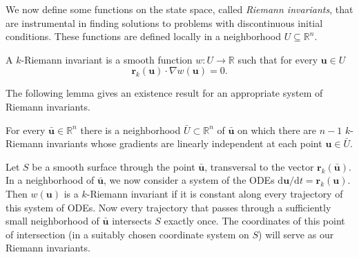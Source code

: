 We now define some functions on the state space, called \emph{Riemann invariants}, that are instrumental in finding solutions to problems with discontinuous initial conditions. These functions are defined locally in a neighborhood $U\subseteq\mathbb{R}^n$.

\begin{Definition}
\label{def:riemann-invariant}
A $k$-Riemann invariant is a smooth function $w:U\to\mathbb{R}$ such that for every $\bm{u}\in U$
\begin{equation}\label{eq:riemann-invariant-definition}
\bm{r}_k(\bm{u})\cdot\nabla w(\bm{u})=0.
\end{equation}

\end{Definition}

The following lemma gives an existence result for an appropriate system of Riemann invariants.

\begin{Lemma}
\label{lem:riemann-invariants-existence}
For every $\bar{\bm{u}}\in\mathbb{R}^n$ there is a neighborhood $\bar U\subset\mathbb{R}^n$ of $\bar{\bm{u}}$ on which there are $n-1$ $k$-Riemann invariants whose gradients are linearly independent at each point $\bm{u}\in\bar U$.
\end{Lemma}

\begin{Proof}
Let $S$ be a smooth surface through the point $\bar{\bm{u}}$, transversal to the vector $\bm{r}_k(\bar{\bm{u}})$. In a neighborhood of $\bar{\bm{u}}$, we now consider a system of the ODEs $\mathrm{d}\bm{u}/\mathrm{d}t=\bm{r}_k(\bm{u})$. Then $w(\bm{u})$ is a $k$-Riemann invariant if it is constant along every trajectory of this system of ODEs. Now every trajectory that passes through a sufficiently small neighborhood of $\bar{\bm{u}}$ intersects $S$ exactly once. The coordinates of this point of intersection (in a suitably chosen coordinate system on $S$) will serve as our Riemann invariants.
\end{Proof}

